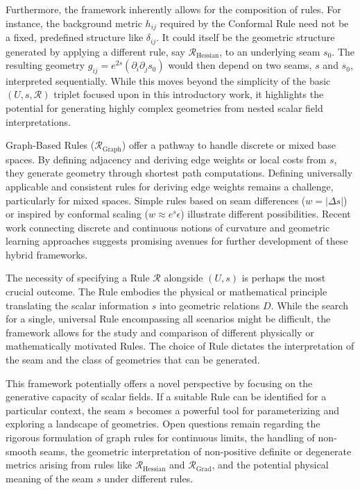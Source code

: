\documentclass[twoside,twocolumn]{article}
\begin{document}
Furthermore, the framework inherently allows for the composition of rules. For instance, the background metric $h_{ij}$ required by the Conformal Rule need not be a fixed, predefined structure like $\delta_{ij}$. It could itself be the geometric structure generated by applying a different rule, say $\mathcal{R}_{\text{Hessian}}$, to an underlying seam $s_0$. The resulting geometry $g_{ij} = e^{2s} (\partial_i \partial_j s_0)$ would then depend on two seams, $s$ and $s_0$, interpreted sequentially. While this moves beyond the simplicity of the basic $(U, s, \mathcal{R})$ triplet focused upon in this introductory work, it highlights the potential for generating highly complex geometries from nested scalar field interpretations.

Graph-Based Rules ($\mathcal{R}_{\text{Graph}}$) offer a pathway to handle discrete or mixed base spaces. By defining adjacency and deriving edge weights or local costs from $s$, they generate geometry through shortest path computations. Defining universally applicable and consistent rules for deriving edge weights remains a challenge, particularly for mixed spaces. Simple rules based on seam differences ($w=|\Delta s|$) or inspired by conformal scaling ($w \approx e^s \epsilon$) illustrate different possibilities.
Recent work connecting discrete and continuous notions of curvature \cite{Ollivier2014Visual} and geometric learning approaches \cite{CoifmanLafon2006} suggests promising avenues for further development of these hybrid frameworks.

The necessity of specifying a Rule $\mathcal{R}$ alongside $(U, s)$ is perhaps the most crucial outcome. The Rule embodies the physical or mathematical principle translating the scalar information $s$ into geometric relations $D$. While the search for a single, universal Rule encompassing all scenarios might be difficult, the framework allows for the study and comparison of different physically or mathematically motivated Rules. The choice of Rule dictates the interpretation of the seam and the class of geometries that can be generated.

This framework potentially offers a novel perspective by focusing on the generative capacity of scalar fields. If a suitable Rule can be identified for a particular context, the seam $s$ becomes a powerful tool for parameterizing and exploring a landscape of geometries. Open questions remain regarding the rigorous formulation of graph rules for continuous limits, the handling of non-smooth seams, the geometric interpretation of non-positive definite or degenerate metrics arising from rules like $\mathcal{R}_{\text{Hessian}}$ and $\mathcal{R}_{\text{Grad}}$, and the potential physical meaning of the seam $s$ under different rules.
\end{document}
